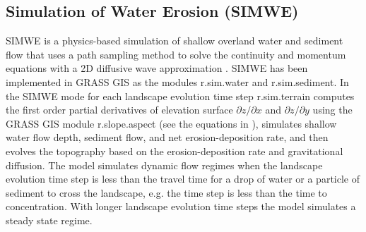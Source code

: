 \documentclass[gmd, manuscript]{copernicus}
\begin{document}
\subsection{Simulation of Water Erosion (SIMWE)} \label{simwe}


SIMWE is a physics-based simulation of shallow overland water and sediment flow
that uses a path sampling method to solve the continuity and momentum equations 
with a 2D diffusive wave approximation 
\citep{Mitas1998,Mitasova2004}.
SIMWE has been implemented in GRASS GIS as the modules 
r.sim.water
and r.sim.sediment. 
In the SIMWE mode for each landscape evolution time step
r.sim.terrain
computes the first order partial derivatives of elevation surface
$\partial z / \partial x$ and $\partial z / \partial y$ 
using the GRASS GIS module r.slope.aspect (see the equations in \citep{hofierka2009}),
simulates shallow water flow depth, sediment flow, and net erosion-deposition rate, 
and then evolves the topography based on the erosion-deposition rate
and gravitational diffusion. 
%
The model simulates dynamic flow regimes
when the landscape evolution time step is less than the travel time 
for a drop of water or a particle of sediment to cross the landscape,
e.g. the time step is less than the time to concentration.
With longer landscape evolution time steps the model simulates a steady state regime. 

% 
\end{document}
